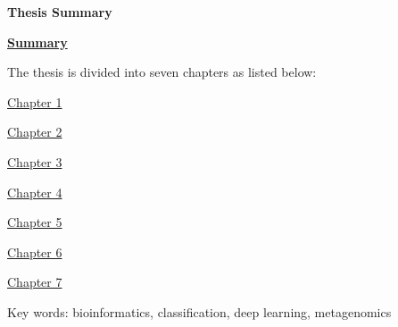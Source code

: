 \newpage
\thispagestyle{empty}


\begin{center}\huge \textbf{Thesis Summary}\end{center}


\begin{center}
\underline{\textbf{Summary}}
\end{center}
%
The thesis is divided into seven chapters as listed below:
%
\begin{flushleft}
\underline{Chapter 1}
\end{flushleft}
%
%
%
%
\begin{flushleft}
\underline{Chapter 2}
\end{flushleft}
%
%
%
\begin{flushleft}
\underline{Chapter 3}
\end{flushleft}
%
%
%
\begin{flushleft}
\underline{Chapter 4}
\end{flushleft}
%
%
%
%
\begin{flushleft}
\underline{Chapter 5}
\end{flushleft}
%
%
%
\begin{flushleft}
\underline{Chapter 6}
\end{flushleft}
%
%
%
\begin{flushleft}
\underline{Chapter 7}
\end{flushleft}



\begin{flushleft}
\large

Key words: bioinformatics, classification, deep learning, metagenomics
\end{flushleft}



